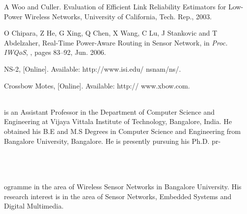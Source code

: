\documentclass[fleqn,twoside]{article}
\begin{document}
\begin{thebibliography}{37}
{A Woo and Culler}. {Evaluation of Efficient Link Reliability Estimators for
  Low-Power Wireless Networks}, University of California, Tech. Rep., 2003.

{O Chipara, Z He, G Xing, Q Chen, X Wang, C Lu, J Stankovic and T
  Abdelzaher}, {Real-Time Power-Aware Routing in Sensor Network}, in
  \emph{Proc. IWQoS}, , pages 83--92, Jun. 2006.

NS-2, [Online]. Available: {http://www.isi.edu/ nsnam/ns/}.

Crossbow Motes, [Online]. Available: {http:// www.xbow.com}.\\\\
\small
\balance
\end{thebibliography}

\begin{minipage}[b][1in][c]{1.8in}
{ is an Assistant Professor in the Department of Computer Science and Engineering at Vijaya Vittala Institute of Technology, Bangalore, India. He obtained his B.E and M.S Degrees in Computer Science and Engineering from Bangalore University, Bangalore. He is presently pursuing his Ph.D. pr-}\\\\\\
\end{minipage}\\
ogramme in the area of Wireless Sensor Networks in Bangalore University. His research interest is in the area of Sensor Networks, Embedded Systems and Digital Multimedia. \\\\
\end{document}
